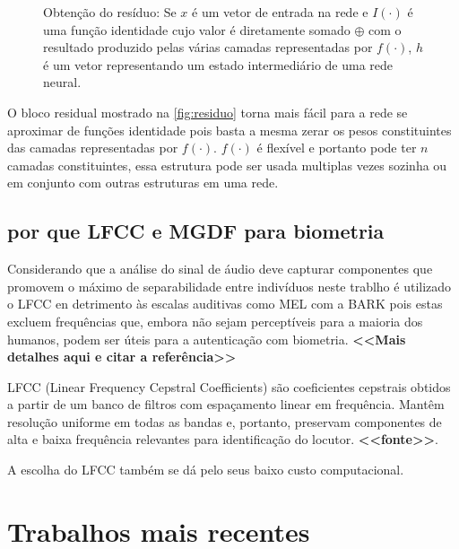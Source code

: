 				\begin{figure}[h]
					\centering
					\caption[Obtenção do resíduo]{Obtenção do resíduo: Se $x$ é um vetor de entrada na rede e  $I(\cdot)$ é uma função identidade cujo valor é diretamente somado $\oplus$ com o resultado produzido pelas várias camadas representadas por $f(\cdot)$, $h$ é um vetor representando um estado intermediário de uma rede neural.}
					
					\label{fig:residuo}
				\end{figure}
			
				\par O bloco residual mostrado na \autoref{fig:residuo} torna mais fácil para a rede se aproximar de funções identidade pois basta a mesma zerar os pesos constituintes das camadas representadas por $f(\cdot)$. $f(\cdot)$ é flexível e portanto pode ter $n$ camadas constituintes, essa estrutura pode ser usada multiplas vezes sozinha ou em conjunto com outras estruturas em uma rede.
				
		\subsection{por que LFCC e MGDF para biometria}
			\par Considerando que a análise do sinal de áudio deve capturar componentes que promovem o máximo de separabilidade entre indivíduos neste trablho é utilizado o LFCC en detrimento às escalas auditivas como MEL com a BARK pois estas excluem frequências que, embora não sejam perceptíveis para a maioria dos humanos, podem ser úteis para a autenticação com biometria. \textbf{<<Mais detalhes aqui e citar a referência>>}
			
			\par LFCC (Linear Frequency Cepstral Coefficients) são coeficientes cepstrais obtidos a partir de um banco de filtros com espaçamento linear em frequência. Mantêm resolução uniforme em todas as bandas e, portanto, preservam componentes de alta e baixa frequência relevantes para identificação do locutor. \textbf{<<fonte>>}.
			
			\par A escolha do LFCC também se dá pelo seus baixo custo computacional.
			
			

	\section{Trabalhos mais recentes}
		\label{sec:trabalhosMaisRecentes}
	
